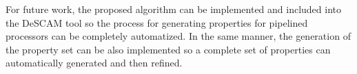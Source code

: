 For future work, the proposed algorithm can be implemented and included into the DeSCAM tool so the process for generating properties for pipelined processors can be completely automatized. In the same manner, the generation of the \SSQED{} property set can be also implemented so a complete set of properties can automatically generated and then refined.